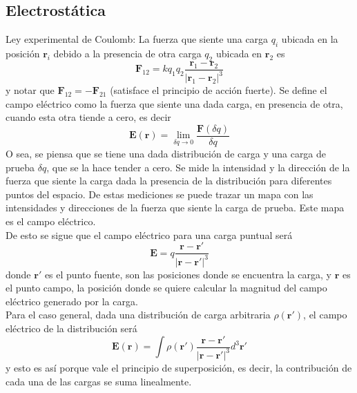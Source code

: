 \subsection{Electrostática}
Ley experimental de Coulomb: La fuerza que siente una carga $q_{i}$ ubicada en la posición $\textbf{r}_{i}$ debido a la presencia de otra carga $q_{2}$ ubicada en $\textbf{r}_{2}$ es
\begin{equation}
    \textbf{F}_{12} =
    k q_{1}q_{2}
    \frac{\textbf{r}_{1}-\textbf{r}_{2}}{|\textbf{r}_{1}-\textbf{r}_{2}|^{3}}
        \label{ec:LeydeCoulomb}
\end{equation}
y notar que $\textbf{F}_{12} = -\textbf{F}_{21}$ (satisface el principio de acción fuerte). Se define el campo eléctrico como la fuerza que siente una dada carga, en presencia de otra, cuando esta otra tiende a cero, es decir
\begin{equation}
    \textbf{E}(\textbf{r}) = \lim_{\delta q \to 0} \frac{\textbf{F}{(\delta q)}}{\delta q}
        \label{ec:DefiniciondeCampoElectrico}
\end{equation}
O sea, se piensa que se tiene una dada distribución de carga y una carga de prueba $\delta q$, que se la hace tender a cero. Se mide la intensidad y la dirección de la fuerza que siente la carga dada la presencia de la distribución para diferentes puntos del espacio. De estas mediciones se puede trazar un mapa con las intensidades y direcciones de la fuerza que siente la carga de prueba. Este mapa es el campo eléctrico.\\
\indent De esto se sigue que el campo eléctrico para una carga puntual será
\begin{equation*}
    \textbf{E} = q\frac{\textbf{r}-\textbf{r}'}{|\textbf{r}-\textbf{r}'|^{3}}
\end{equation*}
donde $\textbf{r}'$ es el punto fuente, son las posiciones donde se encuentra la carga, y $\textbf{r}$ es el punto campo, la posición donde se quiere calcular la magnitud del campo eléctrico generado por la carga.\\ 
\indent Para el caso general, dada una distribución de carga arbitraria $\rho(\textbf{r}')$, el campo eléctrico de la distribución será
\begin{equation}
    \textbf{E}(\textbf{r}) =
    \int \rho(\textbf{r}')
    \frac{\textbf{r}-\textbf{r}'}{|\textbf{r}-\textbf{r}'|^{3}}
    d^{3}\textbf{r}'
        \label{ec:CampoElectrico}
\end{equation}
y esto es así porque vale el principio de superposición, es decir, la contribución de cada una de las cargas se suma linealmente.

